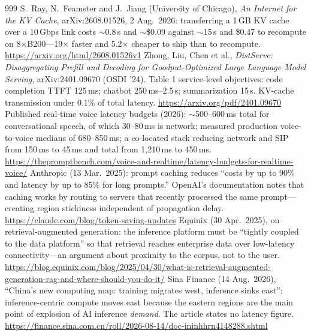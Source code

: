\begin{thebibliography}{999}
 S.~Ray, N.~Feamster and J.~Jiang (University of Chicago), \emph{An Internet for the KV Cache}, arXiv:2608.01526, 2 Aug.\ 2026: transferring a 1\,GB KV cache over a 10\,Gbps link costs $\sim$0.8\,s and $\sim$\$0.09 against $\sim$15\,s and \$0.47 to recompute on 8$\times$B200---19$\times$ faster and 5.2$\times$ cheaper to ship than to recompute. \url{https://arxiv.org/html/2608.01526v1}
 Zhong, Liu, Chen et al., \emph{DistServe: Disaggregating Prefill and Decoding for Goodput-Optimized Large Language Model Serving}, arXiv:2401.09670 (OSDI '24). Table 1 service-level objectives: code completion TTFT 125\,ms; chatbot 250\,ms--2.5\,s; summarization 15\,s. KV-cache transmission under 0.1\% of total latency. \url{https://arxiv.org/pdf/2401.09670}
 Published real-time voice latency budgets (2026): $\sim$500--600\,ms total for conversational speech, of which 30--80\,ms is network; measured production voice-to-voice medians of 680--850\,ms; a co-located stack reducing network and SIP from 150\,ms to 45\,ms and total from 1,210\,ms to 450\,ms. \url{https://thepromptbench.com/voice-and-realtime/latency-budgets-for-realtime-voice/}
 Anthropic (13 Mar.\ 2025): prompt caching reduces ``costs by up to 90\% and latency by up to 85\% for long prompts.'' OpenAI's documentation notes that caching works by routing to servers that recently processed the same prompt---creating region stickiness independent of propagation delay. \url{https://claude.com/blog/token-saving-updates}
 Equinix (30 Apr.\ 2025), on retrieval-augmented generation: the inference platform must be ``tightly coupled to the data platform'' so that retrieval reaches enterprise data over low-latency connectivity---an argument about proximity to the corpus, not to the user. \url{https://blog.equinix.com/blog/2025/04/30/what-is-retrieval-augmented-generation-rag-and-where-should-you-do-it/}
 Sina Finance (14 Aug.\ 2026), ``China's new computing map: training migrates west, inference sinks east'': inference-centric compute moves east because the eastern regions are the main point of explosion of AI inference \emph{demand}. The article states no latency figure. \url{https://finance.sina.com.cn/roll/2026-08-14/doc-ininhhrn4148288.shtml}



\end{thebibliography}
